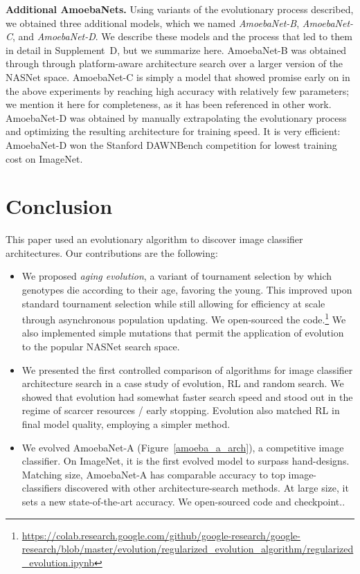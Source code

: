 \documentclass[letterpaper]{article} \usepackage{aaai19}  \usepackage{times}  \usepackage{helvet}  \usepackage{courier}  \usepackage{graphicx}  \frenchspacing
\begin{document}
\textbf{Additional AmoebaNets.} Using variants of the evolutionary process described, we obtained three additional models, which we named \mbox{\textit{AmoebaNet-B}}, \mbox{\textit{AmoebaNet-C}}, and \mbox{\textit{AmoebaNet-D}}. We describe these models and the process that led to them in detail in Supplement~D, but we summarize here. \mbox{AmoebaNet-B} was obtained through through platform-aware architecture search over a larger version of the NASNet space.  \mbox{AmoebaNet-C} is simply a model that showed promise early on in the above experiments by reaching high accuracy with relatively few parameters; we mention it here for completeness, as it has been referenced in other work\cite{cubuk2018autoaugment}. \mbox{AmoebaNet-D} was obtained by manually extrapolating the evolutionary process and optimizing the resulting architecture for training speed. It is very efficient: \mbox{AmoebaNet-D} won the Stanford DAWNBench competition for lowest training cost on ImageNet\cite{coleman2018analysis}.


\section{Conclusion}


This paper used an evolutionary algorithm to discover image classifier architectures. Our contributions are the following:
\begin{itemize}
    \item We proposed \textit{aging evolution}, a variant of tournament selection by which genotypes die according to their age, favoring the young. This improved upon standard tournament selection while still allowing for efficiency at scale through asynchronous population updating. We open-sourced the code.\footnote{\url{https://colab.research.google.com/github/google-research/google-research/blob/master/evolution/regularized_evolution_algorithm/regularized_evolution.ipynb}} We also implemented simple mutations that permit the application of evolution to the popular NASNet search space.
    \item We presented the first controlled comparison of algorithms for image classifier architecture search in a case study of evolution, RL and random search. We showed that evolution had somewhat faster search speed and stood out in the regime of scarcer resources / early stopping. Evolution also matched RL in final model quality, employing a simpler method.
    \item We evolved \mbox{AmoebaNet-A} (Figure~\ref{amoeba_a_arch}), a competitive image classifier. On ImageNet, it is the first evolved model to surpass hand-designs. Matching size, \mbox{AmoebaNet-A} has comparable accuracy to top image-classifiers discovered with other architecture-search methods. At large size, it sets a new state-of-the-art accuracy. We open-sourced code and checkpoint.\footnotemark{}.
\end{itemize}
\end{document}
